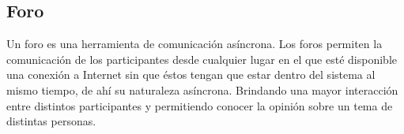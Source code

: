 \subsection{Foro}
Un foro es una herramienta de comunicación asíncrona. Los foros permiten la comunicación de los participantes desde 
cualquier lugar en el que  esté  disponible  una  conexión  a Internet  sin  que  éstos  tengan  que  estar dentro del 
sistema al mismo tiempo, de ahí su naturaleza asíncrona. Brindando una mayor interacción entre distintos 
participantes y permitiendo conocer la opinión sobre un tema de distintas personas.


